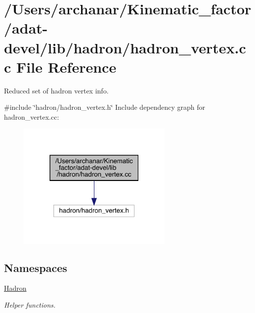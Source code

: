 \hypertarget{adat-devel_2lib_2hadron_2hadron__vertex_8cc}{}\section{/\+Users/archanar/\+Kinematic\+\_\+factor/adat-\/devel/lib/hadron/hadron\+\_\+vertex.cc File Reference}
\label{adat-devel_2lib_2hadron_2hadron__vertex_8cc}


Reduced set of hadron vertex info.  


{\ttfamily \#include \char`\"{}hadron/hadron\+\_\+vertex.\+h\char`\"{}}\newline
Include dependency graph for hadron\+\_\+vertex.\+cc\+:
\nopagebreak
\begin{figure}[H]
\begin{center}
\leavevmode
\includegraphics[width=214pt]{d6/d3d/adat-devel_2lib_2hadron_2hadron__vertex_8cc__incl}
\end{center}
\end{figure}
\subsection*{Namespaces}
\begin{DoxyCompactItemize}
\item 
 \mbox{\hyperlink{namespaceHadron}{Hadron}}
\begin{DoxyCompactList}\small\item\em Helper functions. \end{DoxyCompactList}\end{DoxyCompactItemize}
